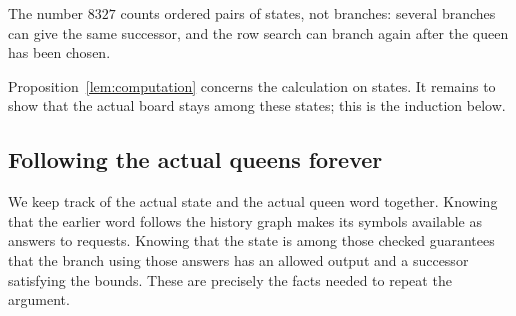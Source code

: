 The number $8327$ counts ordered pairs of states, not branches:
several branches can give the same successor, and the row search can
branch again after the queen has been chosen.

Proposition~\ref{lem:computation} concerns the calculation on
states. It remains to show that the actual board stays among these
states; this is the induction below.

\newpage
\subsection{Following the actual queens forever}\label{sec:identification}

We keep track of the actual state and the actual queen word
together. Knowing that the earlier word follows the history graph
makes its symbols available as answers to requests. Knowing that the
state is among those checked guarantees that the branch using those
answers has an allowed output and a successor satisfying the bounds.
These are precisely the facts needed to repeat the argument.

